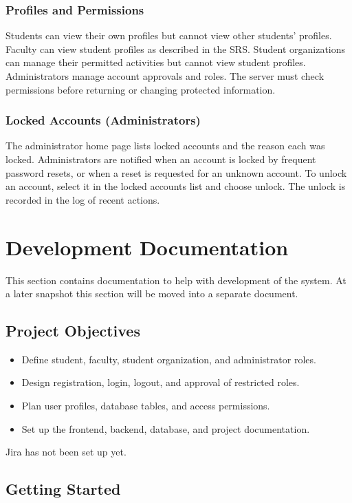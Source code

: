 	\subsubsection{Profiles and Permissions}
	Students can view their own profiles but cannot view other students' profiles. Faculty can view student profiles as described in the SRS. Student organizations can manage their permitted activities but cannot view student profiles. Administrators manage account approvals and roles. The server must check permissions before returning or changing protected information.

	\subsubsection{Locked Accounts (Administrators)}
	The administrator home page lists locked accounts and the reason each was locked. Administrators are notified when an account is locked by frequent password resets, or when a reset is requested for an unknown account. To unlock an account, select it in the locked accounts list and choose unlock. The unlock is recorded in the log of recent actions.

\newpage %
\section{Development Documentation}
This section contains documentation to help with development of the system.
At a later snapshot this section will be moved into a separate document.

	\subsection{Project Objectives}
		\begin{itemize}
		\item Define student, faculty, student organization, and administrator roles.
		\item Design registration, login, logout, and approval of restricted roles.
		\item Plan user profiles, database tables, and access permissions.
		\item Set up the frontend, backend, database, and project documentation.
		\end{itemize}
	Jira has not been set up yet.

\subsection{Getting Started}
